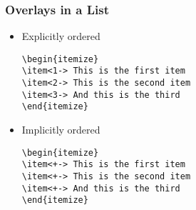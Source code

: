 \documentclass[handout]{beamer}
\begin{document}
\begin{frame}[fragile]
\frametitle{Overlays in a List}

\begin{itemize}
\item<+-> Explicitly ordered
\begin{verbatim}
\begin{itemize}
\item<1-> This is the first item
\item<2-> This is the second item 
\item<3-> And this is the third
\end{itemize}
\end{verbatim}

\item<+-> Implicitly ordered

\begin{verbatim}
\begin{itemize}
\item<+-> This is the first item
\item<+-> This is the second item 
\item<+-> And this is the third
\end{itemize}
\end{verbatim}

\end{itemize}
\end{frame}

\end{document}
